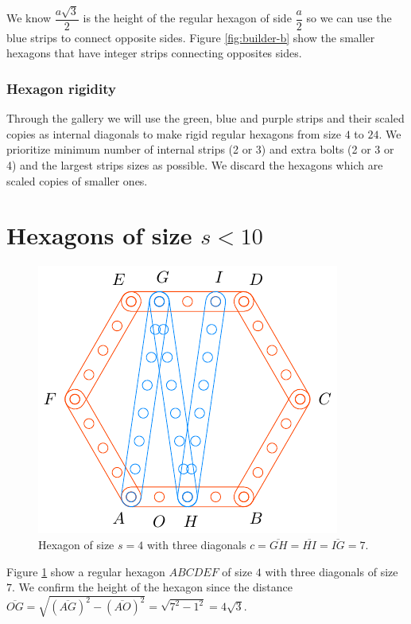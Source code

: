 \documentclass[11pt]{article}
\begin{document}
We know $\dfrac{a\sqrt3}2$ is the height of the regular hexagon of side $\dfrac{a}2$ so we can use the blue strips to connect opposite sides. Figure \ref{fig:builder-b} show the smaller hexagons that have integer strips connecting opposites sides.

\subsubsection{Hexagon rigidity}

Through the gallery we will use the green, blue and purple strips and their scaled copies as internal diagonals to make rigid regular hexagons from size $4$ to $24$. We prioritize minimum number of internal strips (2 or 3) and extra bolts (2 or 3 or 4) and the largest strips sizes as possible. We discard the hexagons which are scaled copies of smaller ones.

\section{Hexagons of size $s < 10$}

\begin{figure}[H]
\centering
\includegraphics[scale=1]{4/hexa-4a}
\caption{Hexagon of size $s = 4$ with three diagonals $c = \overline{GH} = \overline{HI} = \overline{IG} = 7$.}
\label{fig:4a}
\end{figure}

Figure \ref{fig:4a} show a regular hexagon $ABCDEF$ of size $4$ with three diagonals of size $7$. We confirm the height of the hexagon since the distance $\overline{OG} = \sqrt{(\overline{AG})^2 - (\overline{AO})^2} = \sqrt{7^2 - 1^2} = 4\sqrt3$.
\end{document}

